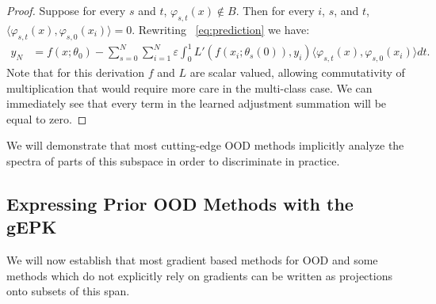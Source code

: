 \begin{proof}
Suppose for every $s$ and $t$, $\varphi_{s, t}(x) \notin B$. Then for every $i$, $s$, and $t$, $\langle \varphi_{s,t}(x), \varphi_{s, 0}(x_i)\rangle = 0$. Rewriting ~\eqref{eq:prediction} we have:
\begin{align}
   y_N &= f(x; \theta_0) - \sum_{s=0}^N \sum_{i = 1}^{N} \varepsilon \int_0^1 L'(f(x_i; \theta_s(0)), y_i) \langle \varphi_{s, t}(x), \varphi_{s,0}(x_i) \rangle dt.
\end{align}
Note that for this derivation $f$ and $L$ are scalar valued, allowing commutativity of multiplication that would require more care in the multi-class case. 
We can immediately see that every term in the learned adjustment summation will be equal to zero. 
\end{proof}
We will demonstrate that most cutting-edge OOD methods implicitly analyze the spectra of parts of this subspace in order to discriminate in practice. 

\subsection{Expressing Prior OOD Methods with the gEPK}

 We will now establish that most gradient based methods for OOD and some methods which do not explicitly rely on gradients can be written as projections onto subsets of this span. 

